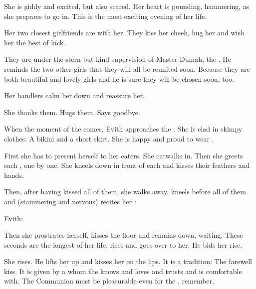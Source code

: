 She is giddy and excited, but also scared. 
Her heart is pounding, hammering, as she prepares to go in. 
This is the most exciting evening of her life. 

Her two closest girlfriends are with her. 
They kiss her cheek, hug her and wish her the best of luck. 

They are under the stern but kind supervision of Master Dumah, the . 
He reminds the two other girls that they will all be reunited soon. 
Because they are both beautiful and lovely girls and he is sure they will be chosen soon, too. 

Her handlers calm her down and reassure her. 

\begin{prose}

  She thanks them. 
  Hugs them. 
  Says goodbye. 
\end{prose}

When the moment of the  comes, Evith approaches the \resphain{}. 
She is clad in skimpy clothes: 
A bikini and a short skirt. 
She is happy and proud to wear . 

First she has to present herself to her eaters. 
She catwalks in.
Then she greets each \resphan{}, one by one. 
She kneels down in front of each and kisses their feathers and hands. 

Then, after having kissed all of them, she walks away, kneels before all of them and (stammering and nervous) recites her :

\begin{prose}
  Evith:
\end{prose}

Then she prostrates herself, kisses the floor and remains down, waiting. 
These seconds are the longest of her life. 
\Teshrial{} rises and goes over to her. 
He bids her rise. 

She rises. 
He lifts her up and kisses her on the lips. 
It is a tradition: 
The farewell kiss. 
It is given by a \resphan{} whom the \naor{} knows and loves and trusts and is comfortable with. 
The Communion must be pleasurable even for the \naor, remember. 

